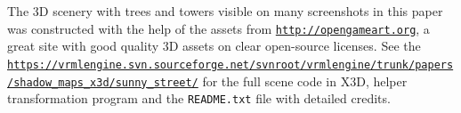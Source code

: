 \documentclass{acmsiggraph}                     %
\newcommand*{\myhref}[2]{\texttt{\href{#1}{\nolinkurl{#2}}}}
\begin{document}
The 3D scenery with trees and towers visible on many screenshots in this paper
was constructed with the help of the assets from \myhref{http://opengameart.org}{http://opengameart.org},
a great site with good quality 3D assets on clear open-source licenses.
See the \myhref{https://vrmlengine.svn.sourceforge.net/svnroot/vrmlengine/trunk/vrml\_engine\_doc/shadow\_maps\_x3d/sunny\_street/}{https://vrmlengine.svn.sourceforge.net/svnroot/vrmlengine/trunk/papers/shadow_maps_x3d/sunny_street/}
for the full scene code in X3D, helper transformation program and the
\texttt{README.txt} file with detailed credits.



\nocite{*}

\end{document}
